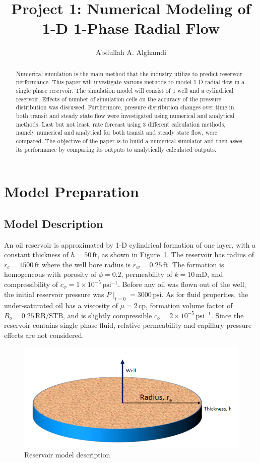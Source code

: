 \documentclass[12pt,letterpaper,titlepage]{article}
\title{Project 1: Numerical Modeling of 1-D 1-Phase Radial Flow}
\author{Abdullah A. Alghamdi}
\begin{document}
\maketitle

\renewcommand{\abstractname}{Executive Summary}
\begin{abstract}
Numerical simulation is the main method that the industry utilize to predict reservoir performance. This paper will investigate various methods to model 1-D radial flow in a single phase reservoir. The simulation model will consist of 1 well and a cylindrical reservoir. Effects of number of simulation cells on the accuracy of the pressure distribution was discussed. Furthermore, pressure distribution changes over time in both transit and steady state flow were investigated using numerical and analytical methods. Last but not least, rate forecast using 3 different calculation methods, namely numerical and analytical for both transit and steady state flow, were compared. The objective of the paper is to build a numerical simulator and then asses its performance by comparing its outputs to analytically calculated outputs.  
\end{abstract}
\tableofcontents
\pagebreak
\section{Model Preparation}
\subsection{Model Description}
An oil reservoir is approximated by 1-D cylindrical formation of one layer, with a constant thickness of $h=50 \,\text{ft}$, as shown in Figure~\ref{fig:1}. The reservoir has radius of $r_e=1500 \,\text{ft}$ where the well bore radius is $r_w=0.25 \,\text{ft}$. The formation is homogeneous with porosity of $\phi=0.2$, permeability of $k=10 \,\text{mD}$, and compressibility of $c_\phi=1\times10^{-5} \,\text{psi}^{-1}$. Before any oil was flown out of the well, the initial reservoir pressure was $P\mid_{t=0}=3000 \,\text{psi}$.\linebreak
As for fluid properties, the under-saturated oil has a viscosity of $\mu=2 \,\text{cp}$, formation volume factor of $B_o=0.25 \,\text{RB/STB}$, and is slightly compressible  $c_o=2\times10^{-5} \,\text{psi}^{-1}$. Since the reservoir contains single phase fluid, relative permeability and capillary pressure effects are not considered.

\begin{figure}[h]
\centering
\includegraphics[width=.8\textwidth]{Capture.PNG}
\caption{\label{fig:1}Reservoir model description}
\end{figure}
\end{document}
